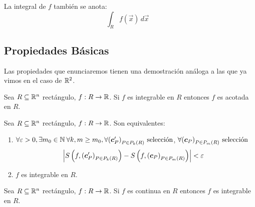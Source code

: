 La integral de $f$ tambi\'en se anota:
    \[ \int_R f(\vec{x})\,d\vec{x} \]

\subsection{Propiedades B\'asicas }



Las propiedades que enunciaremos tienen una demostraci\'on an\'aloga a las que ya vimos en el caso de $\mathbb{R}^2$.

\begin{proposicion}
Sea $ R \subseteq \mathbb{R}^n $ rect\'angulo, $ f:R \to \mathbb{R} $. Si $ f $ es integrable en $ R $ entonces $ f $ es acotada en $ R $.
\end{proposicion}

\begin{proposicion} %
Sea $ R \subseteq \mathbb{R}^n $ rect\'angulo, $ f:R \to \mathbb{R} $. Son equivalentes:
\begin{enumerate}
    \item $ \forall \varepsilon > 0, \exists m_0\in \mathbb{N}\: \forall k, m
    \geq m_0, \forall {(\boldsymbol{c}'_P)}_{P \in P_{k}(R)} \allowbreak \text{ selecci\'on} $,
    $\forall {(\boldsymbol{c}_P)}_{P \in P_{m}(R)} \allowbreak \text{ selecci\'on}  $
        \[ \left\lvert S\left(f, {(\boldsymbol{c}'_P)}_{P \in P_{k}(R)}\right) -
            S\left(f, {(\boldsymbol{c}_P)}_{P \in P_{m}(R)}\right) \right\rvert < \varepsilon \]
    \item $ f $ es integrable en $ R $.
\end{enumerate}
\end{proposicion}

\begin{proposicion}
Sea $ R \subseteq \mathbb{R}^n $ rect\'angulo, $ f:R \to \mathbb{R} $. Si $ f $ es continua en $ R $ entonces $ f $ es integrable en $ R $.
\end{proposicion}

